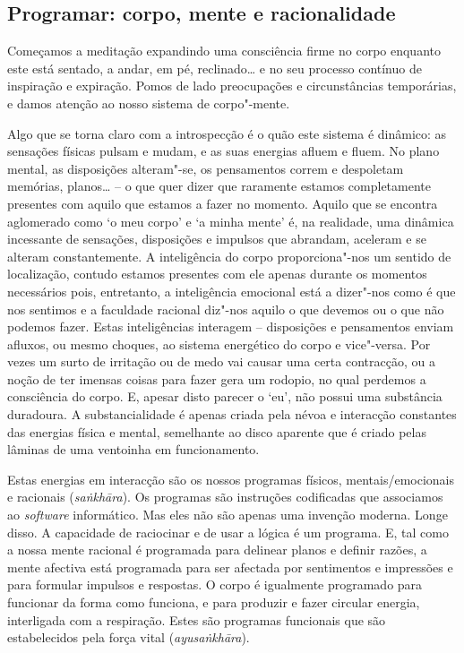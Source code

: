 \subsection{Programar: corpo, mente e racionalidade}

Começamos a meditação expandindo uma consciência firme no corpo enquanto este
está sentado, a andar, em pé, reclinado\ldots{} e no seu processo contínuo de
inspiração e expiração. Pomos de lado preocupações e circunstâncias temporárias,
e damos atenção ao nosso sistema de corpo"-mente.

Algo que se torna claro com a introspecção é o quão este sistema é dinâmico: as
sensações físicas pulsam e mudam, e as suas energias afluem e fluem. No plano
mental, as disposições alteram"-se, os pensamentos correm e despoletam memórias,
planos\ldots{} -- o que quer dizer que raramente estamos completamente presentes com
aquilo que estamos a fazer no momento. Aquilo que se encontra aglomerado como `o
meu corpo' e `a minha mente' é, na realidade, uma dinâmica incessante de
sensações, disposições e impulsos que abrandam, aceleram e se alteram
constantemente. A inteligência do corpo proporciona"-nos um sentido de
localização, contudo estamos presentes com ele apenas durante os momentos
necessários pois, entretanto, a inteligência emocional está a dizer"-nos como é
que nos sentimos e a faculdade racional diz"-nos aquilo o que devemos ou o que
não podemos fazer. Estas inteligências interagem -- disposições e pensamentos
enviam afluxos, ou mesmo choques, ao sistema energético do corpo e vice"-versa.
Por vezes um surto de irritação ou de medo vai causar uma certa contracção, ou a
noção de ter imensas coisas para fazer gera um rodopio, no qual perdemos a
consciência do corpo. E, apesar disto parecer o `eu', não possui uma substância
duradoura. A substancialidade é apenas criada pela névoa e interacção constantes
das energias física e mental, semelhante ao disco aparente que é criado pelas
lâminas de uma ventoinha em funcionamento.

Estas energias em interacção são os nossos programas físicos, mentais/emocionais
e racionais (\emph{saṅkhāra}). Os programas são instruções codificadas que
associamos ao \emph{software} informático. Mas eles não são apenas uma invenção
moderna. Longe disso. A capacidade de raciocinar e de usar a lógica é um
programa. E, tal como a nossa mente racional é programada para delinear planos e
definir razões, a mente afectiva está programada para ser afectada por
sentimentos e impressões e para formular impulsos e respostas. O corpo é
igualmente programado para funcionar da forma como funciona, e para produzir e
fazer circular energia, interligada com a respiração. Estes são programas
funcionais que são estabelecidos pela força vital (\emph{ayusaṅkhāra}).

